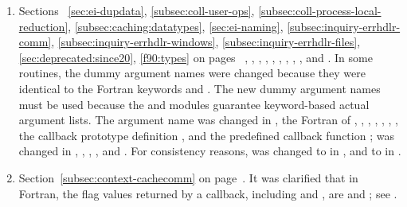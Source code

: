 \begin{enumerate}
\item 
Sections~%
\ref{sec:ei-dupdata},
\ref{subsec:coll-user-ops},
\ref{subsec:coll-process-local-reduction},
\ref{subsec:caching:datatypes},
\ref{sec:ei-naming},
\ref{subsec:inquiry-errhdlr-comm},
\ref{subsec:inquiry-errhdlr-windows},
\ref{subsec:inquiry-errhdlr-files},
\ref{sec:deprecated:since20},
\ref{f90:types}
on pages~%
\pageref{sec:ei-dupdata},
\pageref{subsec:coll-user-ops},
\pageref{subsec:coll-process-local-reduction},
\pageref{subsec:caching:datatypes},
\pageref{sec:ei-naming},
\pageref{subsec:inquiry-errhdlr-comm},
\pageref{subsec:inquiry-errhdlr-windows},
\pageref{subsec:inquiry-errhdlr-files},
\pageref{sec:deprecated:since20}, and
\pageref{f90:types}.
In some routines, the dummy argument names were changed because they
were identical to the Fortran keywords  and .
The new dummy argument names must be used because the
 and  modules guarantee keyword-based actual argument lists. 
The argument name  was changed 
  in ,
    the Fortran  of ,
    ,
    ,
    ,
    ,
    ,
    ,
  the callback prototype definition  
    ,
  and the predefined callback function
    ;
 was changed
    in ,
       ,
       ,
       , and
       .
For consistency reasons,  was changed to 
  in ,
and  to  
  in .

\item 
Section~\ref{subsec:context-cachecomm} on page~\pageref{subsec:context-cachecomm}. 
\newline 
It was clarified that in Fortran, the flag values 
returned by a  callback,
including 
and , 
are  and ; see .


\end{enumerate}

